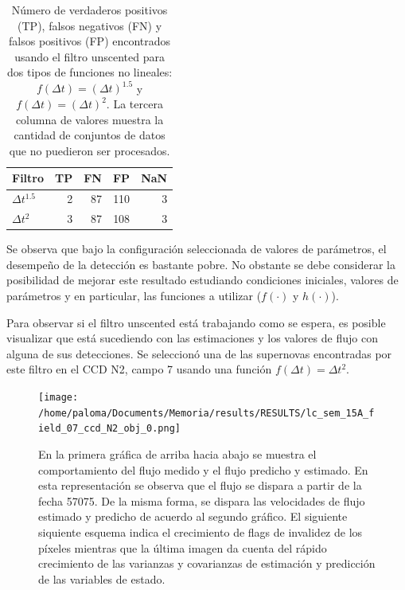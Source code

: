 \begin{table}[h!]
\centering
\caption{N\'umero de verdaderos positivos (TP), falsos negativos (FN) y falsos positivos (FP) encontrados usando el filtro unscented para dos tipos de funciones no lineales: $f(\Delta t) = (\Delta t)^{1.5}$ y $f(\Delta t) = (\Delta t)^{2}$. La tercera columna de valores muestra la cantidad de conjuntos de datos que no puedieron ser procesados.}
\begin{tabular}{|l|r|r|r|r|}
\hline
\textbf{Filtro} & \textbf{TP} & \textbf{FN} & \textbf{FP} & \textbf{NaN}\\ \hline
$\Delta t^{1.5}$          & 2          & 87          & 110 &  3 \\ \hline
$\Delta t^{2}$             & 3          & 87          & 108  & 3 \\ \hline
\end{tabular}
\label{tab:tpfn_ukf}
\end{table}
\bigskip

Se observa que bajo la configuraci\'on seleccionada de valores de par\'ametros, el desempe\~no de la detecci\'on es bastante pobre. No obstante se debe considerar la posibilidad de mejorar este resultado estudiando condiciones iniciales, valores de par\'ametros y en particular, las funciones a utilizar ($f(\cdot)$ y $h(\cdot)$).
\bigskip

Para observar si el filtro unscented est\'a trabajando como se espera, es posible visualizar que est\'a sucediendo con las estimaciones y los valores de flujo con alguna de sus detecciones. Se seleccion\'o una de las supernovas encontradas por este filtro en el CCD N2, campo 7 usando una funci\'on $f(\Delta t) = \Delta t^{2}$.

\begin{figure}
\centering
\texttt{[image: /home/paloma/Documents/Memoria/results/RESULTS/lc\_sem\_15A\_field\_07\_ccd\_N2\_obj\_0.png]}
\caption{En la primera gr\'afica de arriba hacia abajo se muestra el comportamiento del flujo medido y el flujo predicho y estimado. En esta representaci\'on se observa que el flujo se dispara a partir de la fecha 57075. De la misma forma, se dispara las velocidades de flujo estimado y predicho de acuerdo al segundo gr\'afico. El siguiente siquiente esquema indica el crecimiento de flags de invalidez de los p\'ixeles  mientras que la \'ultima imagen da cuenta del r\'apido crecimiento de las varianzas y covarianzas de estimaci\'on y predicci\'on de las variables de estado. }
\label{ukf_rlc}
\end{figure}

